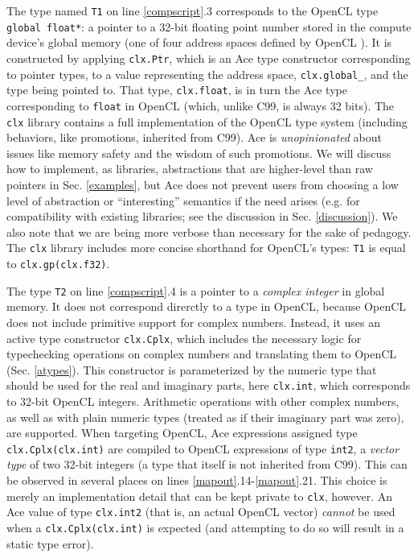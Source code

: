 \documentclass[9pt,preprint]{sigplanconf}
\begin{document}
The type named \verb|T1| on line \ref{compscript}.3 corresponds to the OpenCL type \verb|global float*|: a pointer to a 32-bit floating point number stored in the compute device's global memory (one of four address spaces defined by OpenCL \cite{opencl11}). It is constructed by applying \verb|clx.Ptr|, which is an Ace type constructor corresponding to pointer types, to a value representing the  address space, \verb|clx.global_|, and the type being pointed to. That type, \verb|clx.float|, is in turn the Ace type corresponding to \verb|float| in OpenCL (which, unlike C99, is always 32 bits). 
The \verb|clx| library contains a full implementation of the OpenCL type system (including behaviors, like promotions, inherited from C99).
Ace is \emph{unopinionated} about issues like memory safety and the wisdom of such promotions. We will discuss how to implement, as libraries, abstractions that are higher-level than raw pointers in Sec. \ref{examples}, but Ace does not prevent users from choosing a low level of abstraction or ``interesting'' semantics if the need arises (e.g. for compatibility with existing libraries; see the discussion in Sec. \ref{discussion}). We also note that we are being more verbose than necessary for the sake of pedagogy. The \verb|clx| library includes more concise shorthand for OpenCL's types: \verb|T1| is equal to \verb|clx.gp(clx.f32)|. %

The type \verb|T2| on line \ref{compscript}.4 is a pointer to a \emph{complex integer} in global memory. It does not correspond direrctly to a type in OpenCL, because OpenCL does not include primitive support for complex numbers. Instead, it uses an active type constructor \verb|clx.Cplx|, which includes the necessary logic for typechecking operations on complex numbers and translating them to OpenCL (Sec. \ref{atypes}). This constructor is parameterized by the numeric type that should be used for the real and imaginary parts, here \verb|clx.int|, which corresponds to 32-bit OpenCL integers. Arithmetic operations with other complex numbers, as well as with plain numeric types (treated as if their imaginary part was zero), are supported. When targeting OpenCL, Ace expressions assigned type \verb|clx.Cplx(clx.int)| are compiled to OpenCL expressions of type \verb|int2|, a  \emph{vector type} of two 32-bit integers (a type that itself is not inherited from C99). This can be observed in several places on lines \ref{mapout}.14-\ref{mapout}.21. This choice is merely an implementation detail that can be kept private to \verb|clx|, however. An Ace value of type \verb|clx.int2| (that is, an actual OpenCL vector) \emph{cannot} be used when a \verb|clx.Cplx(clx.int)| is expected (and attempting to do so will result in a static type error).%
\end{document}
